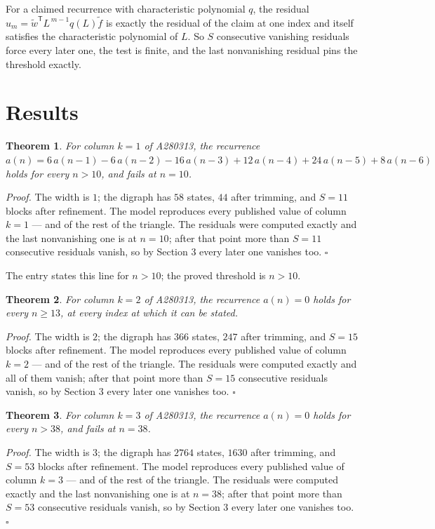 \documentclass[11pt]{article}
\newtheorem{theorem}{Theorem}
\theoremstyle{definition}
\begin{document}
For a claimed recurrence with characteristic polynomial $q$, the residual $u_m = \tilde w^{\mathsf T}L^{\,m-1}q(L)\tilde f$ is exactly the residual of the claim at one index and itself satisfies the characteristic polynomial of $L$. So $S$ consecutive vanishing residuals force every later one, the test is finite, and the last nonvanishing residual pins the threshold exactly.

\section{Results}

\begin{theorem} For column $k = 1$ of A280313, the recurrence $a(n) = 6\,a(n-1) - 6\,a(n-2) - 16\,a(n-3) + 12\,a(n-4) + 24\,a(n-5) + 8\,a(n-6)$ holds for every $n > 10$, and fails at $n = 10$.\end{theorem}

{\itshape Proof.} The width is $1$; the digraph has $58$ states, $44$ after trimming, and $S = 11$ blocks after refinement. The model reproduces every published value of column $k = 1$ --- and of the rest of the triangle. The residuals were computed exactly and the last nonvanishing one is at $n = 10$; after that point more than $S = 11$ consecutive residuals vanish, so by Section 3 every later one vanishes too. $\square$

The entry states this line for $n > 10$; the proved threshold is $n > 10$.

\begin{theorem} For column $k = 2$ of A280313, the recurrence $a(n) = 0$ holds for every $n \ge 13$, at every index at which it can be stated.\end{theorem}

{\itshape Proof.} The width is $2$; the digraph has $366$ states, $247$ after trimming, and $S = 15$ blocks after refinement. The model reproduces every published value of column $k = 2$ --- and of the rest of the triangle. The residuals were computed exactly and all of them vanish; after that point more than $S = 15$ consecutive residuals vanish, so by Section 3 every later one vanishes too. $\square$

\begin{theorem} For column $k = 3$ of A280313, the recurrence $a(n) = 0$ holds for every $n > 38$, and fails at $n = 38$.\end{theorem}

{\itshape Proof.} The width is $3$; the digraph has $2764$ states, $1630$ after trimming, and $S = 53$ blocks after refinement. The model reproduces every published value of column $k = 3$ --- and of the rest of the triangle. The residuals were computed exactly and the last nonvanishing one is at $n = 38$; after that point more than $S = 53$ consecutive residuals vanish, so by Section 3 every later one vanishes too. $\square$
\end{document}
